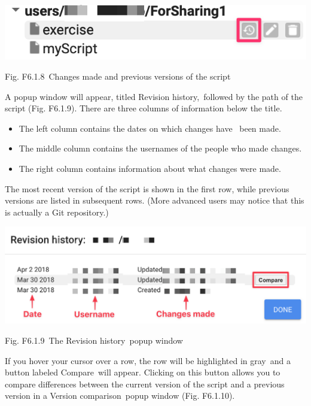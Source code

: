 \documentclass[
  letterpaper,
  DIV=11,
  numbers=noendperiod]{scrreprt}
\providecommand{\tightlist}{%
  \setlength{\itemsep}{0pt}\setlength{\parskip}{0pt}}\usepackage{longtable,booktabs,array}
\begin{document}
\includegraphics{./F6/image17.png}

Fig. F6.1.8~Changes made and previous versions of the script

A popup window will appear, titled Revision history,~followed by the
path of the script (Fig. F6.1.9). There are three columns of information
below the title.

\begin{itemize}
\tightlist
\item
  The left column contains the dates on which changes have ~been made.
\item
  The middle column contains the usernames of the people who made
  changes.
\item
  The right column contains information about what changes were made. ~
\end{itemize}

The most recent version of the script is shown in the first row, while
previous versions are listed in subsequent rows. (More advanced users
may notice that this is actually a Git repository.)

\includegraphics{./F6/image19.png}

Fig. F6.1.9~The Revision history~popup window

If you hover your cursor over a row, the row will be highlighted in
gray~and a button labeled Compare~will appear. Clicking on this button
allows you to compare differences between the current version of the
script and a previous version in a Version comparison~popup window (Fig.
F6.1.10).
\end{document}
